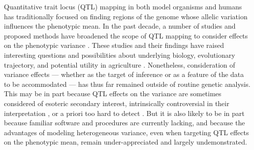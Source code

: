 
Quantitative trait locus (QTL) mapping in both model organisms and humans has traditionally focused on finding regions of the genome whose allelic variation influences the phenotypic mean.
In the past decade, a number of studies and proposed methods have broadened the scope of QTL mapping to consider effects on the phenotypic variance \citep{Pare2010,Ronnegard2011a,Hulse2013}. 
These studies and their findings have raised interesting questions and possibilities about underlying biology, evolutionary trajectory, and potential utility in agriculture \citep{Wagner1997,Dworkin2005,Mulder2015}.
Nonetheless, consideration of variance effects --- whether as the target of inference or as a feature of the data to be accommodated ---
has thus far remained outside of routine genetic analysis.
This may be in part because QTL effects on the variance are sometimes considered of esoteric secondary interest, intrinsically controversial in their interpretation \citep{Sun2013a,Shen2013}, or a priori too hard to detect \citep{Visscher2010a}.
But it is also likely to be in part because familiar software and procedures are currently lacking, and because the advantages of modeling heterogeneous variance, even when targeting QTL effects on the phenotypic mean, remain under-appreciated and largely undemonstrated.

